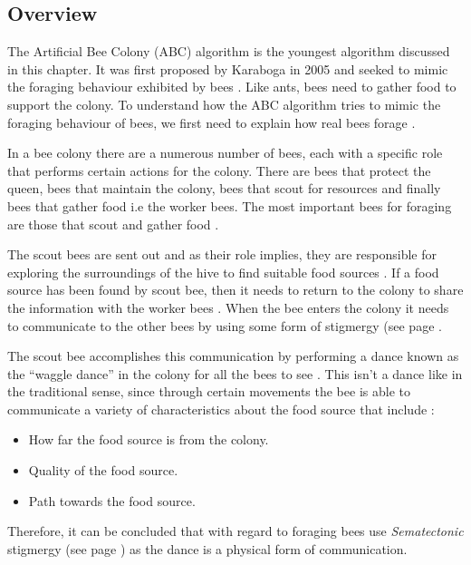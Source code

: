 \subsection{Overview}
The Artificial Bee Colony (ABC) algorithm is the youngest algorithm discussed in this chapter. It was first proposed by Karaboga in 2005 and seeked to mimic the foraging behaviour exhibited by bees \cite{ABCCompareStudy,ABCLeafConstrained,ABCNumericalOptimization}. Like ants, bees need to gather food to support the colony. To understand how the ABC algorithm tries to mimic the foraging behaviour of bees, we first need to explain how real bees forage \cite{ABCCompareStudy}. 

In a bee colony there are a numerous number of bees, each with a specific role that performs certain actions for the colony. There are bees that protect the queen, bees that maintain the colony, bees that scout for resources and finally bees that gather food i.e the worker bees. The most important bees for foraging are those that scout and gather food \cite{ABCCompareStudy}. 

The scout bees are sent out and as their role implies, they are responsible for exploring the surroundings of the hive to find suitable food sources \cite{ABCCompareStudy}. If a food source has been found by scout bee, then it needs to return to the colony to share the information with the worker bees \cite{ABCCompareStudy}. When the bee enters the colony it needs to communicate to the other bees by using some form of stigmergy (see page \pageref{def:stigmergy} \cite{ABCCompareStudy}.

The scout bee accomplishes this communication by performing a dance known as the ``waggle dance'' in the colony for all the bees to see \cite{ABCCompareStudy}. This isn't a dance like in the traditional sense, since through certain movements the bee is able to communicate a variety of characteristics about the food source that include \cite{ABCCompareStudy}:
\begin{itemize}
\item How far the food source is from the colony.
\item Quality of the food source.
\item Path towards the food source.
\end{itemize}

Therefore, it can be concluded that with regard to foraging bees use \emph{Sematectonic} stigmergy (see page \pageref{def:sematectonic}) as the dance is a physical form of communication.

